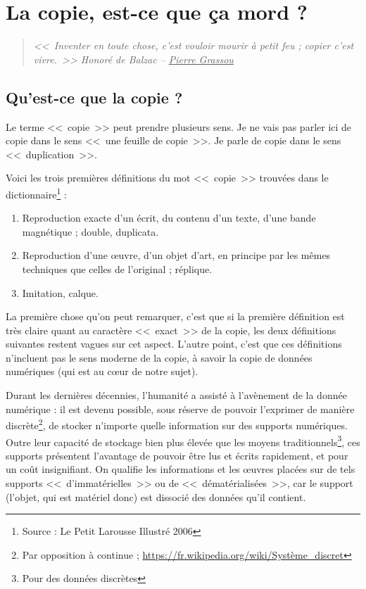 \chapter{La copie, est-ce que ça mord ?}

\begin{quote}
\textit{{\Large <<~Inventer en toute chose, c'est vouloir mourir à petit feu ; copier c'est vivre.~>>} \hspace{25pt}Honoré de Balzac -- \underline{Pierre Grassou}}
\end{quote}

\section{Qu'est-ce que la copie ?}

Le terme <<~copie~>> peut prendre plusieurs sens. Je ne vais pas parler ici de copie dans le sens <<~une feuille de copie~>>. Je parle de copie dans le sens <<~duplication~>>.

Voici les trois premières définitions du mot <<~copie~>> trouvées dans le dictionnaire\footnote{Source : Le Petit Larousse Illustré 2006} :
\begin{enumerate}
\item Reproduction exacte d'un écrit, du contenu d'un texte, d'une bande magnétique ; double, duplicata.
\item Reproduction d'une œuvre, d'un objet d'art, en principe par les mêmes techniques que celles de l'original ; réplique.
\item Imitation, calque.
\end{enumerate}\bigskip

La première chose qu'on peut remarquer, c'est que si la première définition est très claire quant au caractère <<~exact~>> de la copie, les deux définitions suivantes restent vagues sur cet aspect.
L'autre point, c'est que ces définitions n'incluent pas le sens moderne de la copie, à savoir la copie de données numériques (qui est au cœur de notre sujet).

Durant les dernières décennies, l'humanité a assisté à l'avènement de la donnée numérique : il est devenu possible, sous réserve de pouvoir l'exprimer de manière discrète\footnote{Par opposition à continue ; \url{https://fr.wikipedia.org/wiki/Système_discret}}, de stocker n'importe quelle information sur des supports numériques.
Outre leur capacité de stockage bien plus élevée que les moyens traditionnels\footnote{Pour des données discrètes}, ces supports présentent l'avantage de pouvoir être lus et écrits rapidement, et pour un coût insignifiant.
On qualifie les informations et les œuvres placées sur de tels supports <<~d'immatérielles~>> ou de <<~dématérialisées~>>, car le support (l'objet, qui est matériel donc) est dissocié des données qu'il contient.

